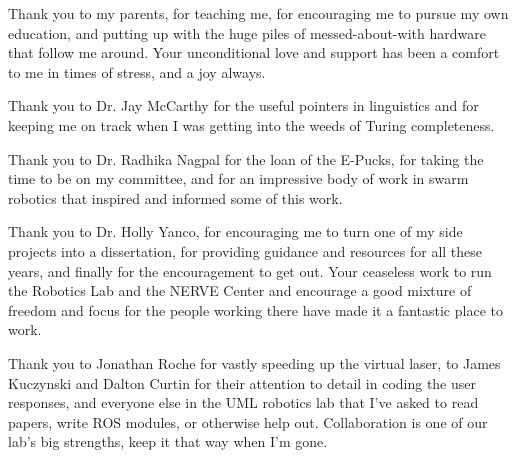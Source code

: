 Thank you to my parents, for teaching me, for encouraging me to pursue my own education, and putting up with the huge piles of messed-about-with hardware that follow me around. Your unconditional love and support has been a comfort to me in times of stress, and a joy always.

Thank you to Dr. Jay McCarthy for the useful pointers in linguistics and for keeping me on track when I was getting into the weeds of Turing completeness. 

Thank you to Dr. Radhika Nagpal for the loan of the E-Pucks, for taking the time to be on my committee, and for an impressive body of work in swarm robotics that inspired and informed some of this work. 

Thank you to Dr. Holly Yanco, for encouraging me to turn one of my side projects into a dissertation, for providing guidance and resources for all these years, and finally for the encouragement to get out. Your ceaseless work to run the Robotics Lab and the NERVE Center and encourage a good mixture of freedom and focus for the people working there have made it a fantastic place to work. 

Thank you to Jonathan Roche for vastly speeding up the virtual laser, to James Kuczynski and Dalton Curtin for their attention to detail in coding the user responses, and everyone else in the UML robotics lab that I've asked to read papers, write ROS modules, or otherwise help out. Collaboration is one of our lab's big strengths, keep it that way when I'm gone.  

